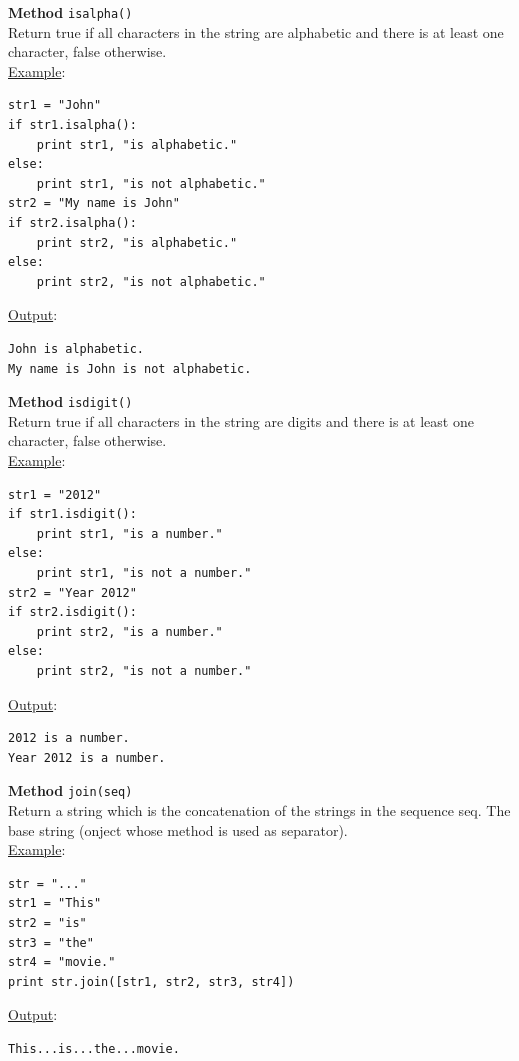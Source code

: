 \noindent
{\bf Method} {\tt isalpha()}\\

\noindent
Return true if all characters in the string are alphabetic and 
there is at least one character, false otherwise.\\

\noindent
\underline{Example}:
\begin{verbatim}
str1 = "John"
if str1.isalpha():
    print str1, "is alphabetic."
else: 
    print str1, "is not alphabetic."
str2 = "My name is John"
if str2.isalpha():
    print str2, "is alphabetic."
else: 
    print str2, "is not alphabetic."
\end{verbatim}
\underline{Output}:
\begin{verbatim}
John is alphabetic.
My name is John is not alphabetic.
\end{verbatim}
\vspace{4mm}

\noindent
{\bf Method} {\tt isdigit()}\\

\noindent
Return true if all characters in the string are digits and there is at least one character, false otherwise.\\

\noindent
\underline{Example}:
\begin{verbatim}
str1 = "2012"
if str1.isdigit():
    print str1, "is a number."
else: 
    print str1, "is not a number."
str2 = "Year 2012"
if str2.isdigit():
    print str2, "is a number."
else: 
    print str2, "is not a number."
\end{verbatim}
\underline{Output}:
\begin{verbatim}
2012 is a number.
Year 2012 is a number.
\end{verbatim}
\vspace{4mm}

\noindent
{\bf Method} {\tt join(seq)}\\

\noindent
Return a string which is the concatenation of the strings in the sequence seq. The 
base string (onject whose method is used as separator).\\

\noindent
\underline{Example}:
\begin{verbatim}
str = "..."
str1 = "This"
str2 = "is"
str3 = "the"
str4 = "movie."
print str.join([str1, str2, str3, str4])
\end{verbatim}
\underline{Output}:
\begin{verbatim}
This...is...the...movie.
\end{verbatim}
\vspace{4mm}

